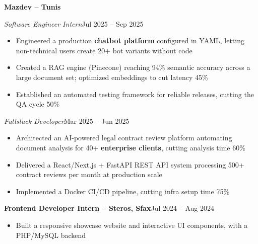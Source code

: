 \documentclass[10pt,a4paper]{article}
\newcommand{\entry}[2]{\vspace{1pt}\noindent\textbf{#1}\hfill{\color{muted}#2}\par}
\newcommand{\subentry}[2]{\noindent\textit{#1}\hfill{\color{muted}#2}\par}
\begin{document}
\entry{Mazdev -- Tunis}{}
\subentry{Software Engineer Intern}{Jul 2025 -- Sep 2025}
\begin{itemize}
  \item Engineered a production \textbf{chatbot platform} configured in YAML, letting non-technical users create 20+ bot variants without code
  \item Created a RAG engine (Pinecone) reaching 94\% semantic accuracy across a large document set; optimized embeddings to cut latency 45\%
  \item Established an automated testing framework for reliable releases, cutting the QA cycle 50\%
\end{itemize}
\subentry{Fullstack Developer}{Mar 2025 -- Jun 2025}
\begin{itemize}
  \item Architected an AI-powered legal contract review platform automating document analysis for 40+ \textbf{enterprise clients}, cutting analysis time 60\%
  \item Delivered a React/Next.js + FastAPI REST API system processing 500+ contract reviews per month at production scale
  \item Implemented a Docker CI/CD pipeline, cutting infra setup time 75\%
\end{itemize}

\entry{Frontend Developer Intern -- Steros, Sfax}{Jul 2024 -- Aug 2024}
\begin{itemize}
  \item Built a responsive showcase website and interactive UI components, with a PHP/MySQL backend
\end{itemize}
\end{document}
